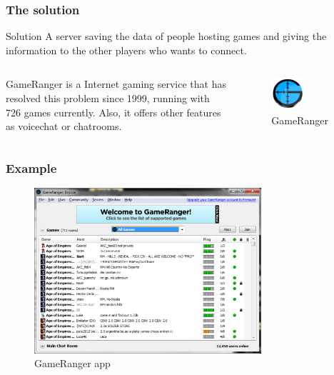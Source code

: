 \documentclass{beamer}
\begin{document}
\begin{frame}
	\frametitle{The solution}
	\begin{block}{Solution}
		A server saving the data of people hosting games and giving the information to the other players who wants to connect.
	\end{block}
	\pause
	\begin{columns}
	\begin{column}{0.6\textwidth}
   GameRanger is a Internet gaming service that has resolved this problem since 1999, running with 726 games currently. Also, it offers other features as voicechat or chatrooms.
   
\end{column}
\begin{column}{0.4\textwidth}
    \begin{center}
    \begin{figure}[H]
     \includegraphics[width=0.5\textwidth]{gameranger.png}
     \caption{GameRanger}
     \end{figure}
     \end{center}
\end{column}
\end{columns}
\end{frame}

\begin{frame}
	\frametitle{Example}
	\begin{figure}[H]
    	\centering
     \includegraphics[width=0.75\textwidth]{gamerangerexample.png}
     \caption{GameRanger app}
     \end{figure}
\end{frame}
\end{document}
